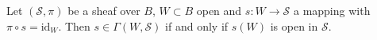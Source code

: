 Let $(\mathcal{S}, \pi)$ be a sheaf over $B$, $W \subset B$ open and $s: W \to \mathcal{S}$ a mapping with $\pi \circ s = \text{id}_W$. Then $s \in \Gamma(W, \mathcal{S})$ if and only if $s(W)$ is open in $\mathcal{S}$.
